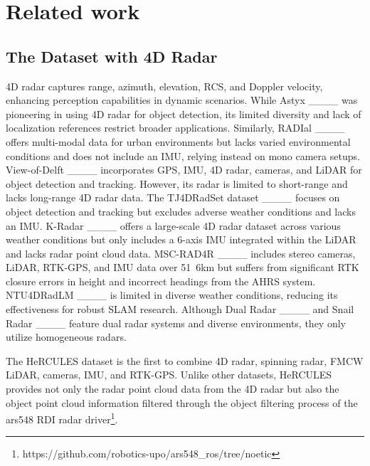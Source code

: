 \section{Related work}
\label{sec:relatedwork}
\subsection{The Dataset with 4D Radar}
 4D radar captures range, azimuth, elevation, \ac{RCS}, and Doppler velocity, enhancing perception capabilities in dynamic scenarios. While Astyx ____ was pioneering in using 4D radar for object detection, its limited diversity and lack of localization references restrict broader applications. Similarly, RADIal ____ offers multi-modal data for urban environments but lacks varied environmental conditions and does not include an \ac{IMU}, relying instead on mono camera setups.
View-of-Delft ____ incorporates \ac{GPS}, \ac{IMU}, 4D radar, cameras, and \ac{LiDAR} for object detection and tracking. However, its radar is limited to short-range and lacks long-range 4D radar data. The TJ4DRadSet dataset ____ focuses on object detection and tracking but excludes adverse weather conditions and lacks an \ac{IMU}. K-Radar ____ offers a large-scale 4D radar dataset across various weather conditions but only includes a 6-axis \ac{IMU} integrated within the \ac{LiDAR} and lacks radar point cloud data. MSC-RAD4R ____ includes stereo cameras, \ac{LiDAR}, RTK-GPS, and \ac{IMU} data over \unit{51.6}{km} but suffers from significant RTK closure errors in height and incorrect headings from the \ac{AHRS} system. NTU4DRadLM ____ is limited in diverse weather conditions, reducing its effectiveness for robust \ac{SLAM} research. Although Dual Radar ____ and Snail Radar ____ feature dual radar systems and diverse environments, they only utilize homogeneous radars.

The HeRCULES dataset is the first to combine 4D radar, spinning radar, \ac{FMCW} \ac{LiDAR}, cameras, \ac{IMU}, and RTK-GPS. Unlike other datasets, HeRCULES provides not only the radar point cloud data from the 4D radar but also the object point cloud information filtered through the object filtering process of the ars548 RDI radar driver\footnote{https://github.com/robotics-upo/ars548\_ros/tree/noetic}.

